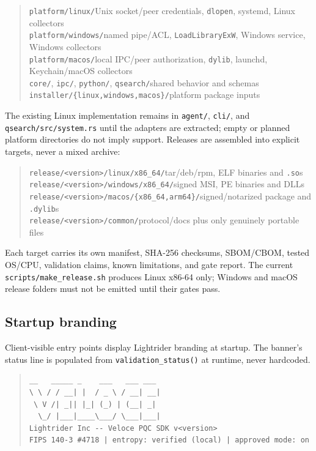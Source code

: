 \documentclass[10pt]{article}
\newcommand{\code}[1]{\texttt{\small #1}}
\begin{document}
\begin{quote}
\code{platform/linux/}\quad Unix socket/peer credentials, \code{dlopen}, systemd,
Linux collectors\\
\code{platform/windows/}\quad named pipe/ACL, \code{LoadLibraryExW}, Windows service,
Windows collectors\\
\code{platform/macos/}\quad local IPC/peer authorization, \code{dylib}, launchd,
Keychain/macOS collectors\\
\code{core/}, \code{ipc/}, \code{python/}, \code{qsearch/}\quad shared behavior and
schemas\\
\code{installer/\{linux,windows,macos\}/}\quad platform package inputs
\end{quote}

The existing Linux implementation remains in \code{agent/}, \code{cli/}, and
\code{qsearch/src/system.rs} until the adapters are extracted; empty or planned platform
directories do not imply support. Releases are assembled into explicit targets, never a
mixed archive:

\begin{quote}
\code{release/<version>/linux/x86\_64/}\quad tar/deb/rpm, ELF binaries and \code{.so}s\\
\code{release/<version>/windows/x86\_64/}\quad signed MSI, PE binaries and DLLs\\
\code{release/<version>/macos/\{x86\_64,arm64\}/}\quad signed/notarized package and
\code{.dylib}s\\
\code{release/<version>/common/}\quad protocol/docs plus only genuinely portable files
\end{quote}

Each target carries its own manifest, SHA-256 checksums, SBOM/CBOM, tested OS/CPU,
validation claims, known limitations, and gate report. The current
\code{scripts/make\_release.sh} produces Linux x86-64 only; Windows and macOS release
folders must not be emitted until their gates pass.

\subsection{Startup branding}\label{sec:branding}

Client-visible entry points display Lightrider branding at startup. The banner's status
line is populated from \code{validation\_status()} at runtime, never hardcoded.

\begin{quote}
\begin{verbatim}
__   _____ _    ___   ___ ___
\ \ / / __| |  / _ \ / __| __|
 \ V /| _|| |_| (_) | (__| _|
  \_/ |___|____\___/ \___|___|
Lightrider Inc -- Veloce PQC SDK v<version>
FIPS 140-3 #4718 | entropy: verified (local) | approved mode: on
\end{verbatim}
\end{quote}
\end{document}
